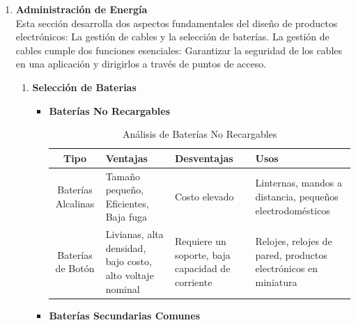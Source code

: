     \begin{enumerate}[label=\alph*)]
    \item \textbf{Administración de Energía} \\
    Esta sección desarrolla dos aspectos fundamentales del diseño de productos electrónicos: La gestión de cables y la selección de baterías.  La gestión de cables cumple dos funciones esenciales: Garantizar la seguridad de los cables en una aplicación y dirigirlos a través de puntos de acceso. 

    \begin{enumerate}[label=\Roman*)]
    \item \textbf{Selección de Baterias} \\
    \begin{itemize}
    
    \needspace{8cm}
    \item \textbf{Baterías No Recargables}
    
        \begin{table}[H]
        \centering
        \begin{tabularx}{\textwidth}{|c|X|X|X|}
        \hline
        \textbf{Tipo} & \textbf{Ventajas} & \textbf{Desventajas} & \textbf{Usos} \\
        \hline
        Baterías Alcalinas & Tamaño pequeño, Eficientes, Baja fuga & Costo elevado & Linternas, mandos a distancia, pequeños electrodomésticos \\
        \hline
        Baterías de Botón & Livianas, alta densidad, bajo costo, alto voltaje nominal & Requiere un soporte, baja capacidad de corriente & Relojes, relojes de pared, productos electrónicos en miniatura \\
        \hline
        \end{tabularx}
        \caption{Análisis de Baterías No Recargables}
        \label{tab:baterias_no_recargables}
        \end{table}

    \needspace{4cm}
    \item \textbf{Baterías Secundarias Comunes}
    

\end{itemize}
\end{enumerate}
\end{enumerate}
